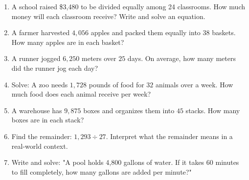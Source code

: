 \documentclass[12pt]{article}
\begin{document}
\begin{tcolorbox}[colframe=black!60, colback=white, 
coltitle=black, colbacktitle=black!15, fonttitle=\bfseries\Large, 
title=Problems, halign title=center, left=10pt, right=10pt, top=10pt, bottom=60pt]
\begin{enumerate}[start=9, itemsep=5em]
    \item A school raised \$3,480 to be divided equally among 24 classrooms. How much money will each classroom receive? Write and solve an equation.
    \item A farmer harvested \( 4,056 \) apples and packed them equally into \( 38 \) baskets. How many apples are in each basket?
    \item A runner jogged \( 6,250 \) meters over \( 25 \) days. On average, how many meters did the runner jog each day?
    \item Solve: A zoo needs \( 1,728 \) pounds of food for \( 32 \) animals over a week. How much food does each animal receive per week?
    \item A warehouse has \( 9,875 \) boxes and organizes them into \( 45 \) stacks. How many boxes are in each stack?
    \item Find the remainder: \( 1,293 \div 27 \). Interpret what the remainder means in a real-world context.
    \item Write and solve: "A pool holds 4,800 gallons of water. If it takes \( 60 \) minutes to fill completely, how many gallons are added per minute?"
    
\end{enumerate}
\end{tcolorbox}

\vspace{1em}
\end{document}
